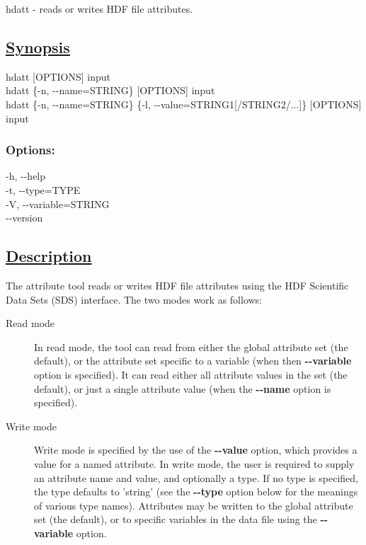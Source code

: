    hdatt - reads or writes HDF file attributes.  
\subsection*{\underline{Synopsis}}


  hdatt [OPTIONS] input\\ 
 hdatt \{-n, -{-}name=STRING\} [OPTIONS] input\\ 
 hdatt \{-n, -{-}name=STRING\} \{-l, -{-}value=STRING1[/STRING2/...]\} [OPTIONS] input\\ 

\subsubsection*{Options:}


  -h, -{-}help\\ 
 -t, -{-}type=TYPE\\ 
 -V, -{-}variable=STRING\\ 
 -{-}version \\ 

\subsection*{\underline{Description}}


 The attribute tool reads or writes HDF file attributes using the HDF Scientific Data Sets (SDS) interface. The two modes work as follows:
\begin{description}
\item[Read mode]In read mode, the tool can read from either the global attribute set (the default), or the attribute set specific to a variable (when then \textbf{-{-}variable}
 option is specified). It can read either all attribute values in the set (the default), or just a single attribute value (when the \textbf{-{-}name}
 option is specified).
\item[Write mode]Write mode is specified by the use of the \textbf{-{-}value}
 option, which provides a value for a named attribute. In write mode, the user is required to supply an attribute name and value, and optionally a type. If no type is specified, the type defaults to 'string' (see the \textbf{-{-}type}
 option below for the meanings of various type names). Attributes may be written to the global attribute set (the default), or to specific variables in the data file using the \textbf{-{-}variable}
 option.

\end{description}


